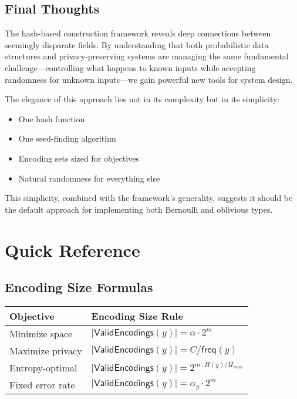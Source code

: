 \documentclass[11pt,final,hidelinks]{article}
\newcommand{\ValidEnc}[1]{\mathsf{ValidEncodings}(#1)}
\newcommand{\Card}[1]{|#1|}
\newcommand{\fprate}{\alpha}
\newcommand{\Freq}[1]{\mathsf{freq}(#1)}
\begin{document}
\subsection{Final Thoughts}

The hash-based construction framework reveals deep connections between seemingly disparate fields. By understanding that both probabilistic data structures and privacy-preserving systems are managing the same fundamental challenge—controlling what happens to known inputs while accepting randomness for unknown inputs—we gain powerful new tools for system design.

The elegance of this approach lies not in its complexity but in its simplicity: 
\begin{itemize}
    \item One hash function
    \item One seed-finding algorithm
    \item Encoding sets sized for objectives
    \item Natural randomness for everything else
\end{itemize}

This simplicity, combined with the framework's generality, suggests it should be the default approach for implementing both Bernoulli and oblivious types.



\appendix

\section{Quick Reference}

\subsection{Encoding Size Formulas}

\begin{center}
\begin{tabular}{ll}
\textbf{Objective} & \textbf{Encoding Size Rule} \\
\hline
Minimize space & $\Card{\ValidEnc{y}} = \fprate \cdot 2^m$ \\
Maximize privacy & $\Card{\ValidEnc{y}} = C/\Freq{y}$ \\
Entropy-optimal & $\Card{\ValidEnc{y}} = 2^{m \cdot H(y)/H_{max}}$ \\
Fixed error rate & $\Card{\ValidEnc{y}} = \fprate_y \cdot 2^m$ \\
\end{tabular}
\end{center}
\end{document}
